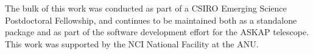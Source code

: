 The bulk of this work was conducted as part of a CSIRO Emerging
Science Postdoctoral Fellowship, and \duchamp continues to be
maintained both as a standalone package and as part of the software
development effort for the ASKAP telescope. This work was supported by
the NCI National Facility at the ANU.



